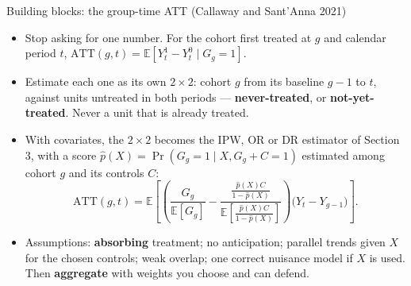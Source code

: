 \documentclass[
  11pt,
  ignorenonframetext,
  aspectratio=169,
]{beamer}
\providecommand{\tightlist}{%
  \setlength{\itemsep}{0pt}\setlength{\parskip}{0pt}}
\begin{document}
\begin{frame}{Building blocks: the group-time ATT (Callaway and
Sant'Anna 2021)}
\protect{}\label{building-blocks-the-group-time-att-callaway-and-santanna-2021}
\begin{itemize}
\tightlist
\item
  Stop asking for one number. For the cohort first treated at \(g\) and
  calendar period \(t\),
  \(\text{ATT}(g, t) = \mathbb{E}[Y^1_t - Y^0_t \mid G_g = 1]\).
\item
  Estimate each one as its own \(2 \times 2\): cohort \(g\) from its
  baseline \(g-1\) to \(t\), against units untreated in both periods ---
  \textbf{never-treated}, or \textbf{not-yet-treated}. Never a unit that
  is already treated.
\item
  With covariates, the \(2 \times 2\) becomes the IPW, OR or DR
  estimator of Section 3, with a score
  \(\hat p(X) = \Pr(G_g = 1 \mid X, G_g + C = 1)\) estimated among
  cohort \(g\) and its controls \(C\): \[
  \text{ATT}(g,t) = \mathbb{E}\!\left[\left(\frac{G_g}{\mathbb{E}[G_g]} - \frac{\frac{\hat p(X) C}{1 - \hat p(X)}}{\mathbb{E}\!\left[\frac{\hat p(X) C}{1 - \hat p(X)}\right]}\right)\big(Y_t - Y_{g-1}\big)\right].
  \]
\item
  Assumptions: \textbf{absorbing} treatment; no anticipation; parallel
  trends given \(X\) for the chosen controls; weak overlap; one correct
  nuisance model if \(X\) is used. Then \textbf{aggregate} with weights
  you choose and can defend.
\end{itemize}
\end{frame}
\end{document}
